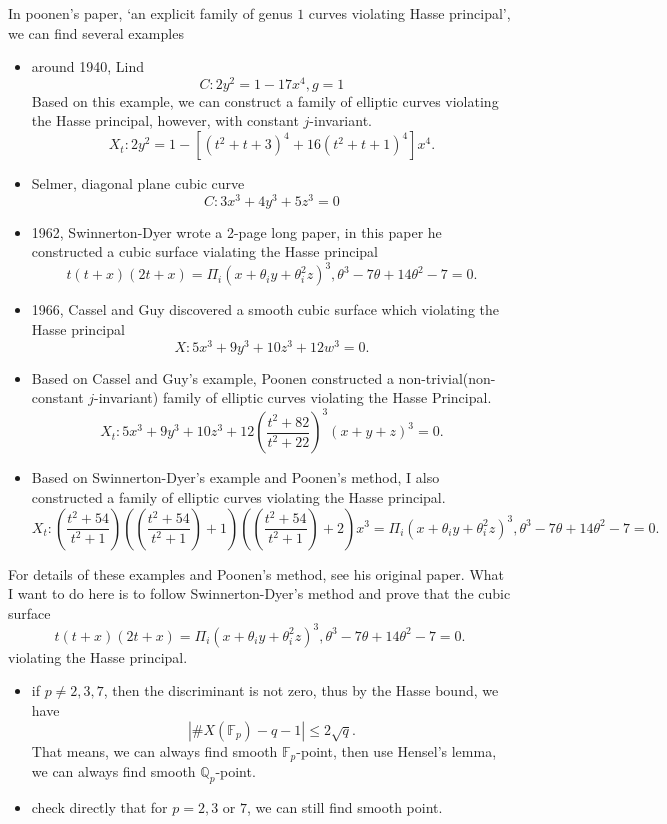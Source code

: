 \documentclass[../main.tex]{subfiles}
\begin{document}
\begin{example}
In poonen's paper, `an explicit family of genus $1$ curves violating Hasse principal', we can find several examples
\begin{itemize}
\item around 1940, Lind
$$C: 2y^{2}=1-17x^{4}, g=1$$
Based on this example, we can construct a family of elliptic curves violating the Hasse principal, however, with constant $j$-invariant.
$$X_{t}:2y^{2}=1-[(t^{2}+t+3)^{4}+16(t^{2}+t+1)^{4}]x^{4}.$$
\item Selmer, diagonal plane cubic curve
$$C: 3x^{3}+4y^{3}+5z^{3}=0$$
\item 1962, Swinnerton-Dyer wrote a 2-page long paper, in this paper he constructed a cubic surface vialating the Hasse principal
$$t(t+x)(2t+x)=\Pi_{i}(x+\theta_{i}y+\theta_{i}^{2}z)^{3}, \theta^{3}-7\theta+14\theta^{2}-7=0.$$
\item 1966, Cassel and  Guy discovered a smooth cubic surface which violating the Hasse principal
$$X: 5x^{3}+9y^{3}+10z^{3}+12w^{3}=0.$$
\item Based on Cassel and Guy's example, Poonen constructed a non-trivial(non-constant $j$-invariant) family of elliptic curves violating the Hasse Principal.
$$X_{t}:5x^{3}+9y^{3}+10z^{3}+12(\frac{t^{2}+82}{t^{2}+22})^{3}(x+y+z)^{3}=0.$$
\item Based on Swinnerton-Dyer's example and Poonen's method, I also constructed a family of elliptic curves violating the Hasse principal.
$$X_{t}:(\frac{t^{2}+54}{t^{2}+1})((\frac{t^{2}+54}{t^{2}+1})+1)((\frac{t^{2}+54}{t^{2}+1})+2)x^{3}=\Pi_{i}(x+\theta_{i}y+\theta_{i}^{2}z)^{3}, \theta^{3}-7\theta+14\theta^{2}-7=0.$$
\end{itemize}
For details of these examples and Poonen's method, see his original paper. What I want to do here is to follow Swinnerton-Dyer's method and prove that the cubic surface
$$t(t+x)(2t+x)=\Pi_{i}(x+\theta_{i}y+\theta_{i}^{2}z)^{3}, \theta^{3}-7\theta+14\theta^{2}-7=0.$$
violating the Hasse principal.
\begin{itemize}
\item if $p\neq 2,3,7$, then the discriminant is not zero, thus by the Hasse bound, we have 
$$|\# X(\mathbb{F}_{p})-q-1|\leq 2\sqrt{q}.$$
That means, we can always find smooth $\mathbb{F}_{p}$-point, then use Hensel's lemma, we can always find smooth $\mathbb{Q}_{p}$-point.
\item check directly that for $p=2,3$ or $7$, we can still find smooth point. 

\end{itemize}
\end{example}
\end{document}

